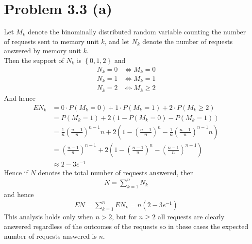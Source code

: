 \section*{Problem 3.3 (a)}
Let $M_k$ denote the binominally distributed random variable counting the number of requests sent to memory unit $k$, 
and let $N_k$ denote the number of requests answered by memory unit $k$. \\
Then the support of $N_k$ is $\left\{ 0,1,2 \right\}$ and 
\begin{align*}
	N_k=0 & \iff  M_k=0 \\
	N_k=1 & \iff  M_k=1 \\
	N_k=2 & \iff  M_k \geq 2
\end{align*}
And hence
\begin{align*}
	EN_k & = 0 \cdot P(M_k=0)+1 \cdot P(M_k=1)+2 \cdot P(M_k \geq 2) \\
	&=P(M_k=1)+2(1-P(M_k=0)-P(M_k=1)) \\
	&= \frac{1}{n}(\frac{n-1}{n})^{n-1}n+2(1-\left( \frac{n-1}{n} \right)^n-\frac{1}{n}\left( \frac{n-1}{n} \right)^{n-1}n) \\
	&= \left( \frac{n-1}{n} \right)^{n-1}+2\left( 1-\left( \frac{n-1}{n} \right)^n-\left( \frac{n-1}{n} \right)^{n-1} \right) \\
	&\approx 2-3e^{-1}
\end{align*}
Hence if $N$ denotes the total number of requests answered, then 
\begin{align*}
	N= \sum_{k=1}^{n}N_k
\end{align*}
and hence
\begin{align*}
	EN=\sum_{k=1}^n EN_k=n\left( 2-3e^{-1} \right)
\end{align*}
This analysis holds only when $n>2$, but for $n\geq 2$ all requests are clearly answered regardless of the outcomes of the requests
so in these cases the expected number of requests answered is $n$.
